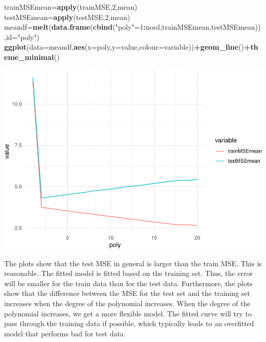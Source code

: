 \documentclass[]{article}
\newenvironment{Shaded}{\begin{snugshade}}{\end{snugshade}}
\newcommand{\KeywordTok}[1]{\textcolor[rgb]{0.13,0.29,0.53}{\textbf{#1}}}
\newcommand{\DataTypeTok}[1]{\textcolor[rgb]{0.13,0.29,0.53}{#1}}
\newcommand{\DecValTok}[1]{\textcolor[rgb]{0.00,0.00,0.81}{#1}}
\newcommand{\StringTok}[1]{\textcolor[rgb]{0.31,0.60,0.02}{#1}}
\newcommand{\OperatorTok}[1]{\textcolor[rgb]{0.81,0.36,0.00}{\textbf{#1}}}
\newcommand{\NormalTok}[1]{#1}
\begin{document}
\begin{Shaded}
\begin{Highlighting}[]
\NormalTok{trainMSEmean=}\KeywordTok{apply}\NormalTok{(trainMSE,}\DecValTok{2}\NormalTok{,mean)}
\NormalTok{testMSEmean=}\KeywordTok{apply}\NormalTok{(testMSE,}\DecValTok{2}\NormalTok{,mean)}
\NormalTok{meandf=}\KeywordTok{melt}\NormalTok{(}\KeywordTok{data.frame}\NormalTok{(}\KeywordTok{cbind}\NormalTok{(}\StringTok{"poly"}\NormalTok{=}\DecValTok{1}\OperatorTok{:}\NormalTok{nord,trainMSEmean,testMSEmean)),}\DataTypeTok{id=}\StringTok{"poly"}\NormalTok{)}
\KeywordTok{ggplot}\NormalTok{(}\DataTypeTok{data=}\NormalTok{meandf,}\KeywordTok{aes}\NormalTok{(}\DataTypeTok{x=}\NormalTok{poly,}\DataTypeTok{y=}\NormalTok{value,}\DataTypeTok{colour=}\NormalTok{variable))}\OperatorTok{+}\KeywordTok{geom_line}\NormalTok{()}\OperatorTok{+}\KeywordTok{theme_minimal}\NormalTok{()}
\end{Highlighting}
\end{Shaded}

\includegraphics{RecEx2-sol_files/figure-latex/unnamed-chunk-13-3.pdf}

The plots show that the test MSE in general is larger than the train
MSE. This is reasonable. The fitted model is fitted based on the
training set. Thus, the error will be smaller for the train data than
for the test data. Furthermore, the plots show that the difference
between the MSE for the test set and the training set increases when the
degree of the polynomial increases. When the degree of the polynomial
increases, we get a more flexible model. The fitted curve will try to
pass through the training data if possible, which typically leads to an
overfitted model that performs bad for test data.
\end{document}
